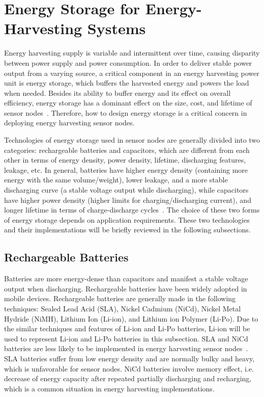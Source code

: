 \section{Energy Storage for Energy-Harvesting Systems} \label{Section:ES}

Energy harvesting supply is variable and intermittent over time, causing disparity between power supply and power consumption. In order to deliver stable power output from a varying source, a critical component in an energy harvesting power unit is energy storage, which buffers the harvested energy and powers the load when needed. Besides its ability to buffer energy and its effect on overall efficiency, energy storage has a dominant effect on the size, cost, and lifetime of sensor nodes~\cite{akhtar2015energy}. Therefore, how to design energy storage is a critical concern in deploying energy harvesting sensor nodes. 

Technologies of energy storage used in sensor nodes are generally divided into two categories: rechargeable batteries and capacitors, which are different from each other in terms of energy density, power density, lifetime, discharging features, leakage, etc. In general, batteries have higher energy density (containing more energy with the same volume/weight), lower leakage, and a more stable discharging curve (a stable voltage output while discharging), while capacitors have higher power density (higher limits for charging/discharging current), and longer lifetime in terms of charge-discharge cycles~\cite{raghunathan2005design, akhtar2015energy}. The choice of these two forms of energy storage depends on application requirements. These two technologies and their implementations will be briefly reviewed in the following subsections.

\subsection{Rechargeable Batteries}

Batteries are more energy-dense than capacitors and manifest a stable voltage output when discharging. Rechargeable batteries have been widely adopted in mobile devices. Rechargeable batteries are generally made in the following techniques: Sealed Lead Acid (SLA), Nickel Cadmium (NiCd), Nickel Metal Hydride (NiMH), Lithium Ion (Li-ion), and Lithium ion Polymer (Li-Po). Due to the similar techniques and features of Li-ion and Li-Po batteries, Li-ion will be used to represent Li-ion and Li-Po batteries in this subsection. SLA and NiCd batteries are less likely to be implemented in energy harvesting sensor nodes~\cite{raghunathan2005design, akhtar2015energy}. SLA batteries suffer from low energy density and are normally bulky and heavy, which is unfavorable for sensor nodes. NiCd batteries involve memory effect, i.e. decrease of energy capacity after repeated partially discharging and recharging, which is a common situation in energy harvesting implementations. 


